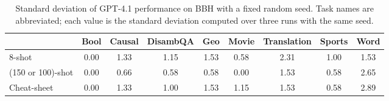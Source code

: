 \begin{table}[t]
\centering
\begin{adjustbox}{max width=1.0\textwidth}
\begin{tabular}{lcccccccc}
\toprule
 & \textbf{Bool} & \textbf{Causal} & \textbf{DisambQA} & \textbf{Geo} & \textbf{Movie} & \textbf{Translation} & \textbf{Sports} & \textbf{Word} \\
\midrule
8-shot & 0.00 & 1.33 & 1.15 & 1.53 & 0.58 & 2.31 & 1.00 & 1.53 \\
(150 or 100)-shot & 0.00 & 0.66 & 0.58 & 0.58 & 0.00 & 1.53 & 0.58 & 2.65 \\
Cheat-sheet & 0.00 & 1.33 & 1.00 & 1.53 & 1.15 & 1.53 & 0.58 & 2.89 \\
\bottomrule
\end{tabular}
\end{adjustbox}
\caption{
Standard deviation of GPT-4.1 performance on BBH with a fixed random seed.
Task names are abbreviated; each value is the standard deviation computed over three runs with the same seed.
}
\label{tab:proprietary_var}
\end{table}